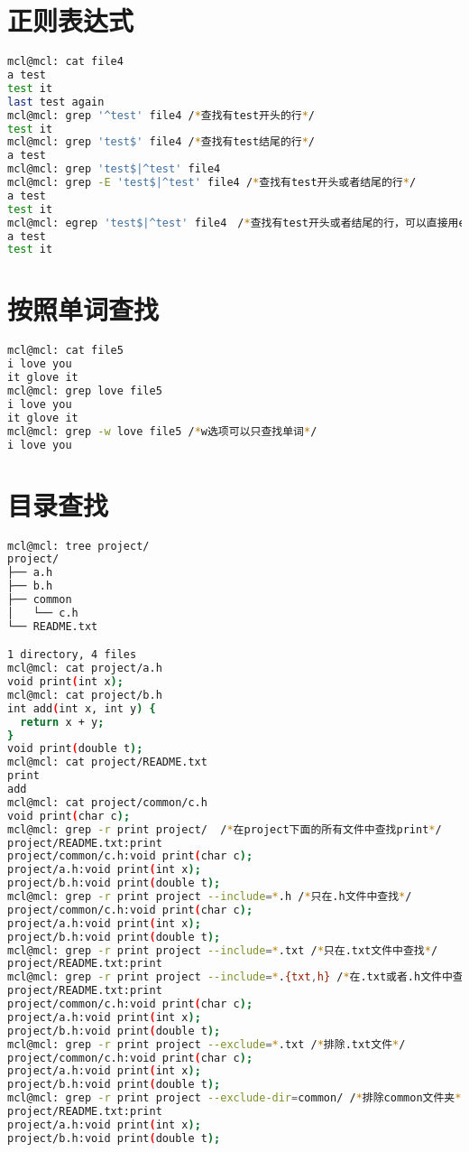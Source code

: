 \documentclass{article}
\begin{document}
\section{正则表达式}
\begin{lstlisting}[language=bash]
mcl@mcl: cat file4
a test
test it
last test again
mcl@mcl: grep '^test' file4 /*查找有test开头的行*/
test it
mcl@mcl: grep 'test$' file4 /*查找有test结尾的行*/
a test
mcl@mcl: grep 'test$|^test' file4
mcl@mcl: grep -E 'test$|^test' file4 /*查找有test开头或者结尾的行*/
a test
test it
mcl@mcl: egrep 'test$|^test' file4　/*查找有test开头或者结尾的行，可以直接用egrep*/
a test
test it
\end{lstlisting}

\section{按照单词查找}
\begin{lstlisting}[language=bash]
mcl@mcl: cat file5
i love you
it glove it
mcl@mcl: grep love file5
i love you
it glove it
mcl@mcl: grep -w love file5 /*w选项可以只查找单词*/
i love you
\end{lstlisting}

\section{目录查找}
\begin{lstlisting}[language=bash]
mcl@mcl: tree project/
project/
├── a.h
├── b.h
├── common
│   └── c.h
└── README.txt

1 directory, 4 files
mcl@mcl: cat project/a.h 
void print(int x);
mcl@mcl: cat project/b.h 
int add(int x, int y) {
  return x + y;
}
void print(double t);
mcl@mcl: cat project/README.txt 
print
add
mcl@mcl: cat project/common/c.h 
void print(char c);
mcl@mcl: grep -r print project/  /*在project下面的所有文件中查找print*/
project/README.txt:print
project/common/c.h:void print(char c);
project/a.h:void print(int x);
project/b.h:void print(double t);
mcl@mcl: grep -r print project --include=*.h /*只在.h文件中查找*/
project/common/c.h:void print(char c);
project/a.h:void print(int x);
project/b.h:void print(double t);
mcl@mcl: grep -r print project --include=*.txt /*只在.txt文件中查找*/
project/README.txt:print
mcl@mcl: grep -r print project --include=*.{txt,h} /*在.txt或者.h文件中查找*/
project/README.txt:print
project/common/c.h:void print(char c);
project/a.h:void print(int x);
project/b.h:void print(double t);
mcl@mcl: grep -r print project --exclude=*.txt /*排除.txt文件*/
project/common/c.h:void print(char c);
project/a.h:void print(int x);
project/b.h:void print(double t);
mcl@mcl: grep -r print project --exclude-dir=common/ /*排除common文件夹*/
project/README.txt:print
project/a.h:void print(int x);
project/b.h:void print(double t);
\end{lstlisting}
\end{document}
